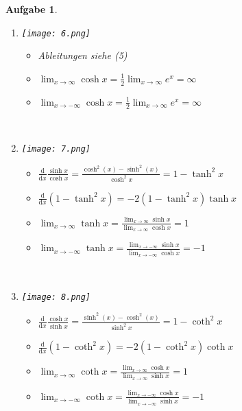 \documentclass[a4paper,11pt,parskip=half,fleqn]{scrartcl}
\newcommand{\wrt}[1]{\mathrm{d}{#1}}
\newcommand{\diff}[1]{\frac{\mathrm{d}}{\wrt{#1}}}
\theoremstyle{note}
\newtheorem{aufgabe}{Aufgabe}
\begin{document}
\begin{aufgabe}
\begin{enumerate}
\begin{minipage}{\linewidth}
	\texttt{[image: 5.png]} 
      \end{minipage}
      \begin{itemize}
	\item $\diff{x}\sinh x=\diff{x}\frac{1}{2}(e^x-e^{-x})=\frac{1}{2}(e^x+e^-x)=\cosh x$
	\item $\diff{x}\cosh x=\diff{x}\frac{1}{2}(e^x+e^{-x})=\frac{1}{2}(e^x-e^{-x})=\sinh x$
	\item $\lim_{x\to\infty}\sinh x=\frac{1}{2}\lim_{x\to\infty}e^x=\infty$
	\item $\lim_{x\to-\infty}\sinh x=-\frac{1}{2}\lim_{x\to-\infty}e^{-x}=-\infty$
      \end{itemize}
    ~\item 
      \begin{minipage}{\linewidth}
	\texttt{[image: 6.png]} 
      \end{minipage}
      \begin{itemize}
	\item Ableitungen siehe (5) 
	\item $\lim_{x\to\infty}\cosh x=\frac{1}{2}\lim_{x\to\infty}e^x=\infty$
	\item $\lim_{x\to-\infty}\cosh x=\frac{1}{2}\lim_{x\to\infty}e^x=\infty$
      \end{itemize}
    ~\item 
      \begin{minipage}{\linewidth}
	\texttt{[image: 7.png]} 
      \end{minipage}
      \begin{itemize}
	\item $\diff{x}\frac{\sinh x}{\cosh x}=\frac{\cosh^2(x)-\sinh^2(x)}{\cosh^2 x}=1-\tanh^2 x$
	\item $\diff{x}(1-\tanh^2 x)=-2(1-\tanh^2 x)\tanh x$
	\item $\lim_{x\to\infty}\tanh x=\frac{\lim_{x\to\infty}\sinh x}{\lim_{x\to\infty}\cosh x}=1$
	\item $\lim_{x\to-\infty}\tanh x=\frac{\lim_{x\to-\infty}\sinh x}{\lim_{x\to-\infty}\cosh x}=-1$
      \end{itemize}
    ~\item 
      \begin{minipage}{\linewidth}
	\texttt{[image: 8.png]} 
      \end{minipage}
      \begin{itemize}
	\item $\diff{x}\frac{\cosh x}{\sinh x}=\frac{\sinh^2(x)-\cosh^2(x)}{\sinh^2 x}=1-\coth^2 x$
	\item $\diff{x}(1-\coth^2 x)=-2(1-\coth^2 x)\coth x$
	\item $\lim_{x\to\infty}\coth x=\frac{\lim_{x\to\infty}\cosh x}{\lim_{x\to\infty}\sinh x}=1$
	\item $\lim_{x\to-\infty}\coth x=\frac{\lim_{x\to-\infty}\cosh x}{\lim_{x\to-\infty}\sinh x}=-1$
      \end{itemize}
  \end{enumerate}
\end{aufgabe}
\end{document}
